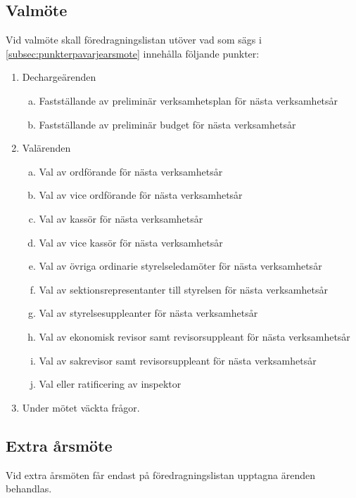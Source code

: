 	\subsection{Valmöte}
	\label{subsec:valmote}
		Vid valmöte skall föredragningslistan utöver vad som sägs i \ref{subsec:punkterpavarjearsmote} innehålla följande punkter: 
		\begin{enumerate}[1.]
		\setlength{\itemsep}{0.0cm}
		\setlength{\parskip}{0.0cm}
		\setcounter{enumi}{3}
			\item Dechargeärenden
			\begin{enumerate}[a.]
			\setlength{\itemsep}{0.0cm}
			\setlength{\parskip}{0.0cm}
				\item Fastställande av preliminär verksamhetsplan för nästa verksamhetsår
				\item Fastställande av preliminär budget för nästa verksamhetsår
				\end{enumerate}
			\item Valärenden
			\begin{enumerate}[a.]
			\setlength{\itemsep}{0.0cm}
			\setlength{\parskip}{0.0cm}
				\item Val av ordförande för nästa verksamhetsår
				\item Val av vice ordförande för nästa verksamhetsår
				\item Val av kassör för nästa verksamhetsår
				\item Val av vice kassör för nästa verksamhetsår
				\item Val av övriga ordinarie styrelseledamöter för nästa verksamhetsår
				\item Val av sektionsrepresentanter till styrelsen för nästa verksamhetsår
				\item Val av styrelsesuppleanter för nästa verksamhetsår
				\item Val av ekonomisk revisor samt revisorsuppleant för nästa verksamhetsår
				\item Val av sakrevisor samt revisorsuppleant för nästa verksamhetsår
				\item Val eller ratificering av inspektor
				\end{enumerate}
		\setcounter{enumi}{5}
			\item Under mötet väckta frågor.
			\end{enumerate}

	\subsection{Extra årsmöte}
	\label{subsec:extraarsmote}
		Vid extra årsmöten får endast på föredragningslistan upptagna ärenden behandlas.

